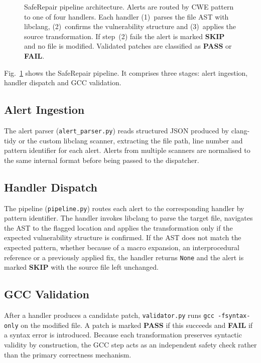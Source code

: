 \documentclass[conference]{IEEEtran}
\begin{document}
\begin{figure}[t]
\caption{SafeRepair pipeline architecture. Alerts are routed by CWE pattern to one
of four handlers. Each handler (1)~parses the file AST with libclang, (2)~confirms
the vulnerability structure and (3)~applies the source transformation. If step~(2)
fails the alert is marked \textbf{SKIP} and no file is modified. Validated patches
are classified as \textbf{PASS} or \textbf{FAIL}.}
\label{fig:pipeline}
\end{figure}

Fig.~\ref{fig:pipeline} shows the SafeRepair pipeline. It comprises three stages:
alert ingestion, handler dispatch and GCC validation.

\subsection{Alert Ingestion}
The alert parser (\texttt{alert\_parser.py}) reads structured JSON produced by
clang-tidy or the custom libclang scanner, extracting the file path, line number
and pattern identifier for each alert. Alerts from multiple scanners are normalised
to the same internal format before being passed to the dispatcher.

\subsection{Handler Dispatch}
The pipeline (\texttt{pipeline.py}) routes each alert to the corresponding handler
by pattern identifier. The handler invokes libclang to parse the target file,
navigates the AST to the flagged location and applies the transformation only if
the expected vulnerability structure is confirmed. If the AST does not match the
expected pattern, whether because of a macro expansion, an interprocedural
reference or a previously applied fix, the handler returns \texttt{None} and the
alert is marked \textbf{SKIP} with the source file left unchanged.

\subsection{GCC Validation}
After a handler produces a candidate patch, \texttt{validator.py} runs
\texttt{gcc -fsyntax-only} on the modified file. A patch is marked \textbf{PASS}
if this succeeds and \textbf{FAIL} if a syntax error is introduced. Because each
transformation preserves syntactic validity by construction, the GCC step acts as
an independent safety check rather than the primary correctness mechanism.
\end{document}
